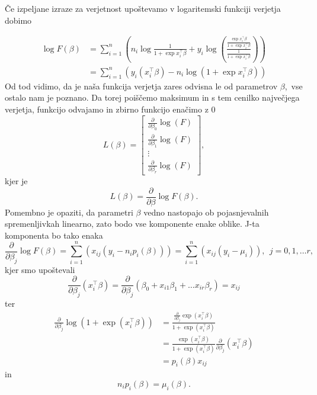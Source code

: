 \documentclass[12pt,a4paper]{amsart}
\theoremstyle{definition} %
\theoremstyle{plain} %
\begin{document}
Če izpeljane izraze za verjetnost  upoštevamo v logaritemski funkciji verjetja dobimo

\begin{align}
    \log F(\beta)  &= \sum_{i=1}^{n}\left( n_{i}\log{\frac{1}{1 + \exp{x_{i}^\top\beta}}}  + y_{i}\log{\left( \frac{\frac{\exp{x_{i}^{\top} \beta}}{1 + \exp{x_{i}^\top\beta}}}{\frac{1}{1 + \exp{x_{i}^\top\beta}}}  \right)} \right) \nonumber\\
                &= \sum_{i=1}^{n}\left( y_{i}(x_{i}^\top\beta) - n_{i}\log(1 + \exp{x_{i}^\top\beta})\right)
\end{align}
Od tod vidimo, da je naša funkcija verjetja zares odvisna le od parametrov $\beta$,~vse ostalo nam je poznano. Da torej poiščemo maksimum in s tem
cenilko največjega verjetja, funkcijo odvajamo in zbirno funkcijo enačimo z 0
\[
    L(\beta) = \begin{bmatrix}
                                 \frac{\partial}{\partial \beta_{0}}\log(F) \\
                                 \frac{\partial}{\partial \beta_{1}}\log(F) \\
                                 \vdots \\
                                 \frac{\partial}{\partial \beta_{r}}\log(F)
                        \end{bmatrix},
\]
kjer je
\[
    L(\beta) = \frac{\partial}{\partial \beta} \log F(\beta).
\]
Pomembno je opaziti, da parametri $\beta$ vedno nastopajo ob pojasnjevalnih spremenljivkah linearno, zato bodo vse komponente enake oblike.
J-ta komponenta bo tako enaka
\begin{equation}
    \frac{\partial}{\partial \beta_{j}} \log F(\beta) = \sum_{i=1}^{n} \left(x_{ij}(y_{i} - n_{i}p_{i}(\beta))\right) = \sum_{i=1}^{n} \left(x_{ij}(y_{i} - \mu_{i})\right),~~j = 0,1,\ldots r,
\end{equation}
kjer smo upoštevali
\[
    \frac{\partial}{\partial \beta_{j}}(x_{i}^\top\beta) = \frac{\partial}{\partial \beta_{j}}\left(\beta_{0} + x_{i1}\beta_{1} + \ldots x_{ir}\beta_{r}\right) = x_{ij}
\]
ter
\begin{align}                                         
    \frac{\partial}{\partial \beta_{j}} \log(1 + \exp(x_{i}^\top\beta)) &= \frac{ \frac{\partial}{\partial \beta_{j}}\exp(x_{i}^\top\beta) }{1 + \exp(x_{i}^\top\beta)} \nonumber \\
    &= \frac{\exp(x_{i}^\top\beta)}{1 + \exp(x_{i}^\top\beta)} \frac{\partial}{\partial \beta_{j}} (x_{i}^\top\beta) \nonumber \\
    &=p_{i}(\beta)x_{ij}
\end{align}
in
\[
    n_{i}p_{i}(\beta) = \mu_{i}(\beta).
\]
\end{document}

